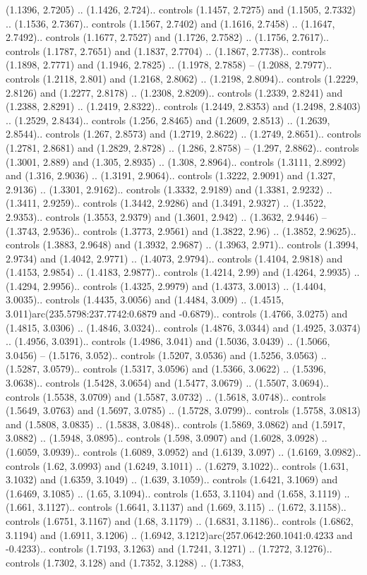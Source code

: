 (1.1396, 2.7205) .. (1.1426, 2.724).. controls (1.1457, 2.7275) and (1.1505, 2.7332) .. (1.1536, 2.7367).. controls (1.1567, 2.7402) and (1.1616, 2.7458) .. (1.1647, 2.7492).. controls (1.1677, 2.7527) and (1.1726, 2.7582) .. (1.1756, 2.7617).. controls (1.1787, 2.7651) and (1.1837, 2.7704) .. (1.1867, 2.7738).. controls (1.1898, 2.7771) and (1.1946, 2.7825) .. (1.1978, 2.7858) -- (1.2088, 2.7977).. controls (1.2118, 2.801) and (1.2168, 2.8062) .. (1.2198, 2.8094).. controls (1.2229, 2.8126) and (1.2277, 2.8178) .. (1.2308, 2.8209).. controls (1.2339, 2.8241) and (1.2388, 2.8291) .. (1.2419, 2.8322).. controls (1.2449, 2.8353) and (1.2498, 2.8403) .. (1.2529, 2.8434).. controls (1.256, 2.8465) and (1.2609, 2.8513) .. (1.2639, 2.8544).. controls (1.267, 2.8573) and (1.2719, 2.8622) .. (1.2749, 2.8651).. controls (1.2781, 2.8681) and (1.2829, 2.8728) .. (1.286, 2.8758) -- (1.297, 2.8862).. controls (1.3001, 2.889) and (1.305, 2.8935) .. (1.308, 2.8964).. controls (1.3111, 2.8992) and (1.316, 2.9036) .. (1.3191, 2.9064).. controls (1.3222, 2.9091) and (1.327, 2.9136) .. (1.3301, 2.9162).. controls (1.3332, 2.9189) and (1.3381, 2.9232) .. (1.3411, 2.9259).. controls (1.3442, 2.9286) and (1.3491, 2.9327) .. (1.3522, 2.9353).. controls (1.3553, 2.9379) and (1.3601, 2.942) .. (1.3632, 2.9446) -- (1.3743, 2.9536).. controls (1.3773, 2.9561) and (1.3822, 2.96) .. (1.3852, 2.9625).. controls (1.3883, 2.9648) and (1.3932, 2.9687) .. (1.3963, 2.971).. controls (1.3994, 2.9734) and (1.4042, 2.9771) .. (1.4073, 2.9794).. controls (1.4104, 2.9818) and (1.4153, 2.9854) .. (1.4183, 2.9877).. controls (1.4214, 2.99) and (1.4264, 2.9935) .. (1.4294, 2.9956).. controls (1.4325, 2.9979) and (1.4373, 3.0013) .. (1.4404, 3.0035).. controls (1.4435, 3.0056) and (1.4484, 3.009) .. (1.4515, 3.011)arc(235.5798:237.7742:0.6879 and -0.6879).. controls (1.4766, 3.0275) and (1.4815, 3.0306) .. (1.4846, 3.0324).. controls (1.4876, 3.0344) and (1.4925, 3.0374) .. (1.4956, 3.0391).. controls (1.4986, 3.041) and (1.5036, 3.0439) .. (1.5066, 3.0456) -- (1.5176, 3.052).. controls (1.5207, 3.0536) and (1.5256, 3.0563) .. (1.5287, 3.0579).. controls (1.5317, 3.0596) and (1.5366, 3.0622) .. (1.5396, 3.0638).. controls (1.5428, 3.0654) and (1.5477, 3.0679) .. (1.5507, 3.0694).. controls (1.5538, 3.0709) and (1.5587, 3.0732) .. (1.5618, 3.0748).. controls (1.5649, 3.0763) and (1.5697, 3.0785) .. (1.5728, 3.0799).. controls (1.5758, 3.0813) and (1.5808, 3.0835) .. (1.5838, 3.0848).. controls (1.5869, 3.0862) and (1.5917, 3.0882) .. (1.5948, 3.0895).. controls (1.598, 3.0907) and (1.6028, 3.0928) .. (1.6059, 3.0939).. controls (1.6089, 3.0952) and (1.6139, 3.097) .. (1.6169, 3.0982).. controls (1.62, 3.0993) and (1.6249, 3.1011) .. (1.6279, 3.1022).. controls (1.631, 3.1032) and (1.6359, 3.1049) .. (1.639, 3.1059).. controls (1.6421, 3.1069) and (1.6469, 3.1085) .. (1.65, 3.1094).. controls (1.653, 3.1104) and (1.658, 3.1119) .. (1.661, 3.1127).. controls (1.6641, 3.1137) and (1.669, 3.115) .. (1.672, 3.1158).. controls (1.6751, 3.1167) and (1.68, 3.1179) .. (1.6831, 3.1186).. controls (1.6862, 3.1194) and (1.6911, 3.1206) .. (1.6942, 3.1212)arc(257.0642:260.1041:0.4233 and -0.4233).. controls (1.7193, 3.1263) and (1.7241, 3.1271) .. (1.7272, 3.1276).. controls (1.7302, 3.128) and (1.7352, 3.1288) .. (1.7383, 